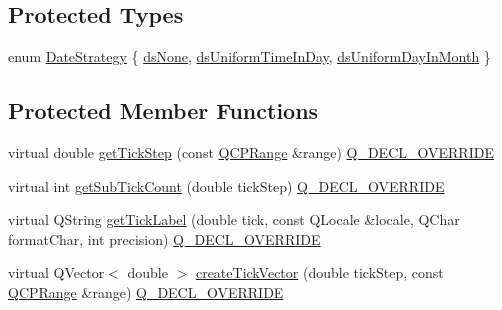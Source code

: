\subsection*{Protected Types}
\begin{DoxyCompactItemize}
\item 
enum \hyperlink{class_q_c_p_axis_ticker_date_time_af2c7c60821a6234ca7a172f42ef7f1d8}{Date\+Strategy} \{ \hyperlink{class_q_c_p_axis_ticker_date_time_af2c7c60821a6234ca7a172f42ef7f1d8a02076ab726129e1ab9e0f999d4314309}{ds\+None}, 
\hyperlink{class_q_c_p_axis_ticker_date_time_af2c7c60821a6234ca7a172f42ef7f1d8a39644957223102224f35662da3ab1a14}{ds\+Uniform\+Time\+In\+Day}, 
\hyperlink{class_q_c_p_axis_ticker_date_time_af2c7c60821a6234ca7a172f42ef7f1d8a7889e1531db9ce1c5d8957b4f0de58ad}{ds\+Uniform\+Day\+In\+Month}
 \}
\end{DoxyCompactItemize}
\subsection*{Protected Member Functions}
\begin{DoxyCompactItemize}
\item 
virtual double \hyperlink{class_q_c_p_axis_ticker_date_time_a0560c14a3f87bb99ab136aca8321b32a}{get\+Tick\+Step} (const \hyperlink{class_q_c_p_range}{Q\+C\+P\+Range} \&range) \hyperlink{qcustomplot_8h_a42cc5eaeb25b85f8b52d2a4b94c56f55}{Q\+\_\+\+D\+E\+C\+L\+\_\+\+O\+V\+E\+R\+R\+I\+DE}
\item 
virtual int \hyperlink{class_q_c_p_axis_ticker_date_time_a78dece0d51426a3c310528d413e09193}{get\+Sub\+Tick\+Count} (double tick\+Step) \hyperlink{qcustomplot_8h_a42cc5eaeb25b85f8b52d2a4b94c56f55}{Q\+\_\+\+D\+E\+C\+L\+\_\+\+O\+V\+E\+R\+R\+I\+DE}
\item 
virtual Q\+String \hyperlink{class_q_c_p_axis_ticker_date_time_a4dc6a03f7ea5c619477528a683ed5c18}{get\+Tick\+Label} (double tick, const Q\+Locale \&locale, Q\+Char format\+Char, int precision) \hyperlink{qcustomplot_8h_a42cc5eaeb25b85f8b52d2a4b94c56f55}{Q\+\_\+\+D\+E\+C\+L\+\_\+\+O\+V\+E\+R\+R\+I\+DE}
\item 
virtual Q\+Vector$<$ double $>$ \hyperlink{class_q_c_p_axis_ticker_date_time_a44c2c09a303d281801b69226e243047d}{create\+Tick\+Vector} (double tick\+Step, const \hyperlink{class_q_c_p_range}{Q\+C\+P\+Range} \&range) \hyperlink{qcustomplot_8h_a42cc5eaeb25b85f8b52d2a4b94c56f55}{Q\+\_\+\+D\+E\+C\+L\+\_\+\+O\+V\+E\+R\+R\+I\+DE}
\end{DoxyCompactItemize}
